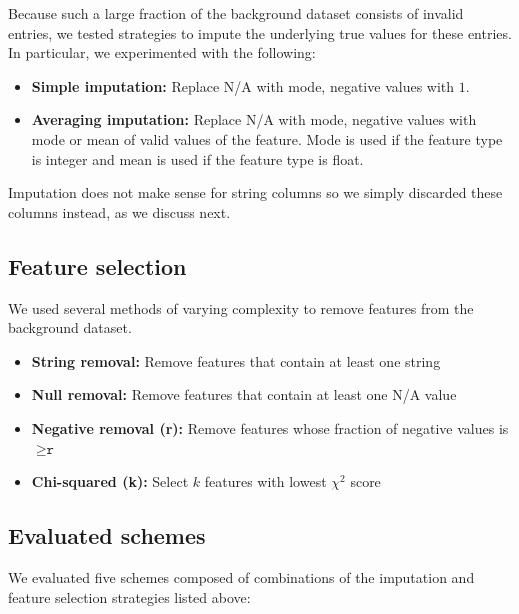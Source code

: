 \documentclass{article} %
\begin{document}
Because such a large fraction of the background dataset consists of invalid entries, we tested strategies to impute the underlying true values for these entries. In particular, we experimented with the following:

\begin{itemize}
\item \textbf{Simple imputation:} Replace N/A with mode, negative values with $1$.
\item \textbf{Averaging imputation:} Replace N/A with mode, negative values with mode or mean of valid values of the feature. Mode is used if the feature type is integer and mean is used if the feature type is float.
\end{itemize}

Imputation does not make sense for string columns so we simply discarded these columns instead, as we discuss next.

\subsection{Feature selection}
\label{sec:featureselection}

We used several methods of varying complexity to remove features from the background dataset.

\begin{itemize}
  \item \textbf{String removal:} Remove features that contain at least one string
  \item \textbf{Null removal:} Remove features that contain at least one N/A value
  \item \textbf{Negative removal (r):} Remove features whose fraction of negative values is $\geq \texttt{r}$
  \item \textbf{Chi-squared (k):} Select $k$ features with lowest $\chi^2$ score
\end{itemize}

\subsection{Evaluated schemes}
\label{sec:evaluatedschemes}

We evaluated five schemes composed of combinations of the imputation and feature selection strategies listed above:
\end{document}
